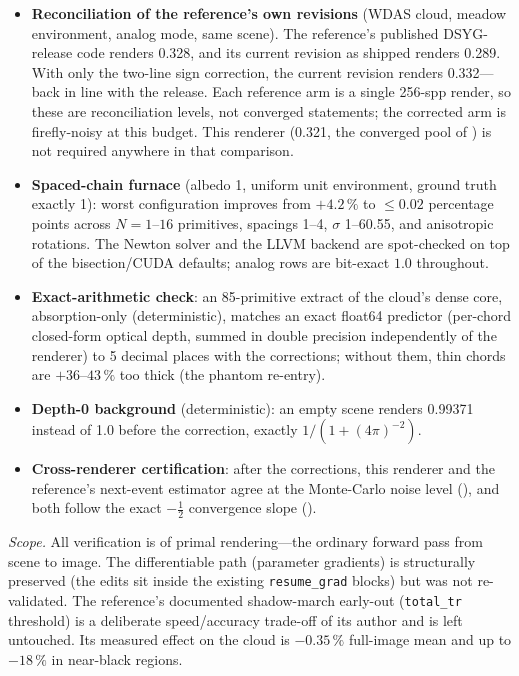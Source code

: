 \begin{itemize}
  \item \textbf{Reconciliation of the reference's own revisions} (WDAS cloud, meadow
  environment, analog mode, same scene). The reference's published DSYG-release code renders
  \num{0.328}, and its current revision as shipped renders \num{0.289}. With only the
  two-line sign correction, the current revision renders \num{0.332}---back in line with the
  release. Each reference arm is a single \num{256}-spp render, so these are reconciliation
  levels, not converged statements; the corrected arm is firefly-noisy at this budget.
  This renderer (\num{0.321}, the converged pool of ) is not
  required anywhere in that comparison.
  \item \textbf{Spaced-chain furnace} (albedo 1, uniform unit environment, ground truth
  exactly 1): worst configuration improves from $+4.2\,\%$ to $\le 0.02$ percentage points
  across $N{=}1$--$16$ primitives, spacings 1--4, $\sigma$ 1--60.55, and anisotropic rotations.
  The Newton solver and the LLVM backend are spot-checked on top of the bisection/CUDA
  defaults; analog rows are bit-exact $1.0$ throughout.
  \item \textbf{Exact-arithmetic check}: an 85-primitive extract of the cloud's dense core,
  absorption-only (deterministic), matches an exact float64 predictor (per-chord closed-form optical depth, summed in double
precision independently of the renderer) to 5 decimal places
  with the corrections; without them, thin chords are $+36$--$43\,\%$ too thick (the phantom
  re-entry).
  \item \textbf{Depth-0 background} (deterministic): an empty scene renders \num{0.99371}
  instead of \num{1.0} before the correction, exactly $1/(1+(4\pi)^{-2})$.
  \item \textbf{Cross-renderer certification}: after the corrections, this renderer and the
  reference's next-event estimator agree at the Monte-Carlo noise level
  (), and both follow the exact $-\tfrac12$ convergence slope
  ().
\end{itemize}

\noindent
\emph{Scope.} All verification is of primal rendering---the ordinary forward pass from scene
to image. The differentiable path (parameter gradients) is
structurally preserved (the edits sit inside the existing \texttt{resume\_grad} blocks) but
was not re-validated. The reference's documented shadow-march early-out
(\texttt{total\_tr} threshold) is a deliberate speed/accuracy trade-off of its author and is
left untouched. Its measured effect on the cloud is $-0.35\,\%$ full-image mean and up to
$-18\,\%$ in near-black regions.

